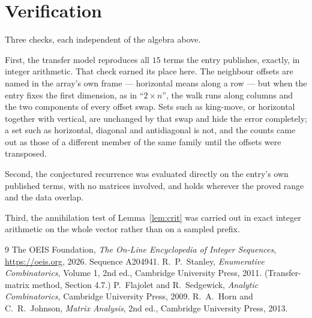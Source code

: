 \documentclass[11pt,a4paper]{article}
\theoremstyle{plain}
\theoremstyle{definition}
\begin{document}
\section{Verification}

Three checks, each independent of the algebra above.

First, the transfer model reproduces all $15$ terms the entry publishes, exactly, in
integer arithmetic. That check earned its place here. The neighbour offsets are named in the
array's own frame --- horizontal means along a row --- but when the entry fixes the first
dimension, as in ``$2\times n$'', the walk runs along columns and the two components of every
offset swap. Sets such as king-move, or horizontal together with vertical, are unchanged by
that swap and hide the error completely; a set such as horizontal, diagonal and antidiagonal
is not, and the counts came out as those of a different member of the same family until the
offsets were transposed.

Second, the conjectured recurrence was evaluated directly on the entry's own published terms,
with no matrices involved, and holds wherever the proved range and the data overlap.

Third, the annihilation test of Lemma~\ref{lem:crit} was carried out in exact integer
arithmetic on the whole vector rather than on a sampled prefix.

\begin{thebibliography}{9}
 The OEIS Foundation, \emph{The On-Line Encyclopedia of Integer
Sequences}, \url{https://oeis.org}, 2026. Sequence A204941.
 R.~P.~Stanley, \emph{Enumerative Combinatorics}, Volume 1, 2nd ed.,
Cambridge University Press, 2011. (Transfer-matrix method, Section 4.7.)
 P.~Flajolet and R.~Sedgewick, \emph{Analytic Combinatorics}, Cambridge
University Press, 2009.
 R.~A.~Horn and C.~R.~Johnson, \emph{Matrix Analysis}, 2nd ed., Cambridge
University Press, 2013.
\end{thebibliography}
\end{document}
